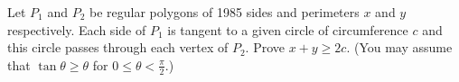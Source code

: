 Let $P_1$ and $P_2$ be regular polygons of 1985 sides and perimeters $x$ and $y$ respectively.  Each side of $P_1$ is tangent to a given circle of circumference $c$ and this circle passes through each vertex of $P_2$.  Prove $x + y \ge 2c$.  (You may assume that $\tan \theta \ge \theta$ for $0 \le \theta < \frac{\pi}{2}$.)